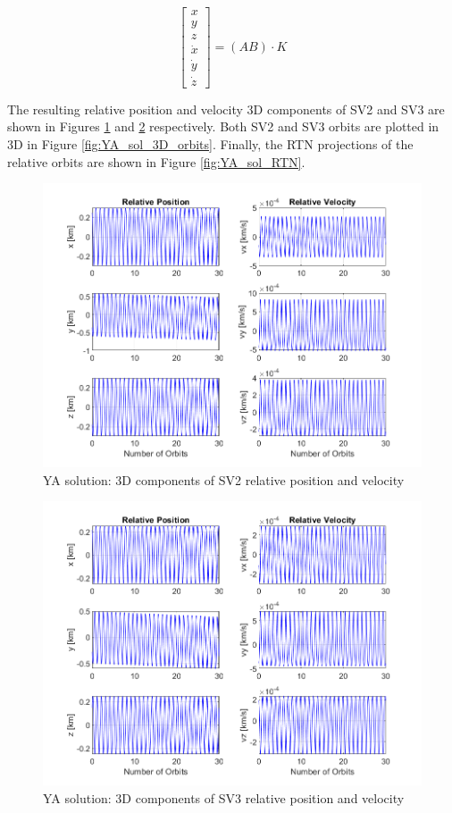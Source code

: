 \[
\begin{bmatrix}
x \\ y\\ z \\ \dot{x} \\ \dot{y} \\ \dot{z}
\end{bmatrix}= (A B) \cdot K
\]

The resulting relative position and velocity 3D components of SV2 and SV3 are shown in Figures \ref{fig:YA_sol_3D_comp_SV2} and \ref{fig:YA_sol_3D_comp_SV3} respectively. Both SV2 and SV3 orbits are plotted in 3D in Figure \ref{fig:YA_sol_3D_orbits}. Finally, the RTN projections of the relative orbits are shown in Figure \ref{fig:YA_sol_RTN}.


\begin{figure}[H]
    \centering
    \includegraphics[width=0.7\linewidth]{sim/figures/PS3/YA_pos_vel_SV2.png}
    \caption{YA solution: 3D components of SV2 relative position and velocity}
    \label{fig:YA_sol_3D_comp_SV2}
\end{figure}
\begin{figure}[H]
    \centering
    \includegraphics[width=0.7\linewidth]{sim/figures/PS3/YA_pos_vel_SV3.png}
    \caption{YA solution: 3D components of SV3 relative position and velocity}
    \label{fig:YA_sol_3D_comp_SV3}
\end{figure}
